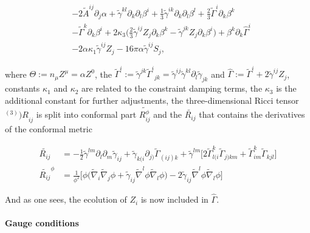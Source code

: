{\begin{align}
        & - 2\widetilde{A}^{ij}\partial_{j}\alpha + \widetilde{\gamma}^{kl}\partial_{k}\partial_{l}\beta^{i} + \frac{1}{3} \widetilde{\gamma}^{ik}\partial_{k}\partial_{l}\beta^{l} + \frac{2}{3}\widetilde{\Gamma}^i\partial_{k}\beta^{k} \\
        & - \widetilde{\Gamma}^k\partial_{k}\beta^{i} + 2\kappa_3\Big(\frac{2}{3}\widetilde{\gamma}^{ij}Z_{j}\partial_{k}\beta^{k} - \widetilde{\gamma}^{jk}Z_{j}\partial_{k}\beta^{i}\Big) + \beta^{k}\partial_{k}\hat{\Gamma}^i \\
        & -2\alpha\kappa_1\widetilde{\gamma}^{ij}Z_{j}- 16\pi\alpha\widetilde{\gamma}^{ij}S_j,
    \label{eq:theory:ccz4equations} %
    \end{align}
    
    where $\Theta:=n_{\mu}Z^{\mu}=\alpha Z^0$, the $\widetilde{\Gamma}^i:=\widetilde{\gamma}^{jk}{\widetilde{\Gamma}^i}_{jk} = \widetilde{\gamma}^{ij}\widetilde{\gamma}^{kl}\partial_{l}\widetilde{\gamma}_{jk}$ and $\hat{\Gamma}:=\widetilde{\Gamma}^i + 2\widetilde{\gamma}^{ij}Z_j$, constants $\kappa_1$ and $\kappa_2$ are related to the constraint damping terms, the $\kappa_3$ is the additional constant for further adjustments, the three-dimensional Ricci tensor ${^{(3)})R}_{ij}$ is split into conformal part $\widetilde{R_{ij}^{\phi}}$ and the $\widetilde{R_{ij}}$ that contains the derivatives of the conformal metric
    
    \begin{align}
        \widetilde{R_{ij}} &= -\frac{1}{2}\widetilde{\gamma}^{lm}\partial_{l}\partial_{m}\widetilde{\gamma}_{ij} + \widetilde{\gamma}_{k(i}\partial_{j)}\widetilde{\Gamma}_{(ij)k} + \widetilde{\gamma}^{lm}\big[2\widetilde{\Gamma}^{k}_{l(i}\widetilde{\Gamma}_{j)km} + \widetilde{\Gamma}^{k}_{im}\widetilde{\Gamma}_{kjl}\big] \\
        \widetilde{R_{ij}}^{\phi} &= \frac{1}{\phi^2}\big[\phi\big(\widetilde{\nabla}_{i}\widetilde{\nabla}_{j}\phi + \widetilde{\gamma}_{ij}\widetilde{\nabla}^{l}\phi\widetilde{\nabla}_{l}\phi\big) - 2\widetilde{\gamma}_{ij}\widetilde{\nabla}^{l}\phi\widetilde{\nabla}_{l}\phi\big]
    \end{align}
    
    And as one sees, the ecolution of $Z_i$ is now included in $\hat{\Gamma}$. 
    
    
    \paragraph{Gauge conditions}
    
}
